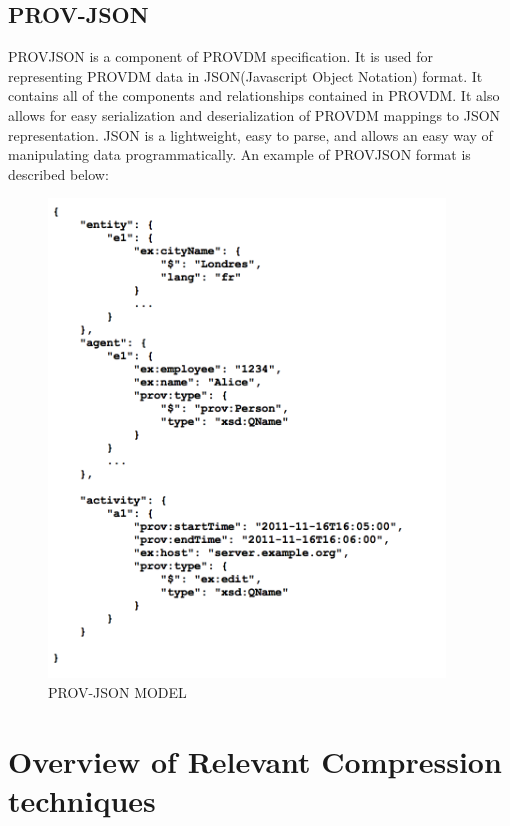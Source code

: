\subsection{PROV-JSON}

PROV\-JSON is a component of PROV\-DM specification. It is used for representing PROV\-DM data in JSON(Javascript Object Notation) format. It contains all of the components and relationships contained in PROV\-DM. It also allows for easy serialization and deserialization of PROV\-DM mappings to JSON representation. JSON is a lightweight, easy to parse, and allows an easy way of manipulating data programmatically. An example of PROV\-JSON format is described below:

\begin{figure}[h]
\begin{center}

\includegraphics[height=5in]{prov_json.png}
\end{center}
\caption{PROV-JSON MODEL}

\end{figure}



\section{Overview of Relevant Compression techniques}

